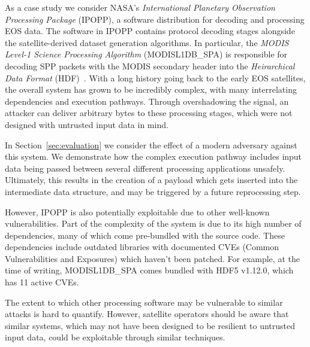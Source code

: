As a case study we consider NASA's \textit{International Planetary Observation Processing Package} (IPOPP), a software distribution for decoding and processing EOS data.
The software in IPOPP contains protocol decoding stages alongside the satellite-derived dataset generation algorithms.
In particular, the \textit{MODIS Level-1 Science Processing Algorithm} (MODISL1DB\_SPA) is responsible for decoding SPP packets with the MODIS secondary header into the \textit{Heirarchical Data Format} (HDF)~\cite{modisL1DB}.
With a long history going back to the early EOS satellites, the overall system has grown to be incredibly complex, with many interrelating dependencies and execution pathways.
Through overshadowing the signal, an attacker can deliver arbitrary bytes to these processing stages, which were not designed with untrusted input data in mind.

In Section~\ref{sec:evaluation} we consider the effect of a modern adversary against this system.
We demonstrate how the complex execution pathway includes input data being passed between several different processing applications unsafely.
Ultimately, this results in the creation of a payload which gets inserted into the intermediate data structure, and may be triggered by a future reprocessing step.

However, IPOPP is also potentially exploitable due to other well-known vulnerabilities.
Part of the complexity of the system is due to its high number of dependencies, many of which come pre-bundled with the source code.
These dependencies include outdated libraries with documented CVEs (Common Vulnerabilities and Exposures) which haven't been patched.
For example, at the time of writing, MODISL1DB\_SPA comes bundled with HDF5 v1.12.0, which has 11 active CVEs.



The extent to which other processing software may be vulnerable to similar attacks is hard to quantify.
However, satellite operators should be aware that similar systems, which may not have been designed to be resilient to untrusted input data, could be exploitable through similar techniques.

